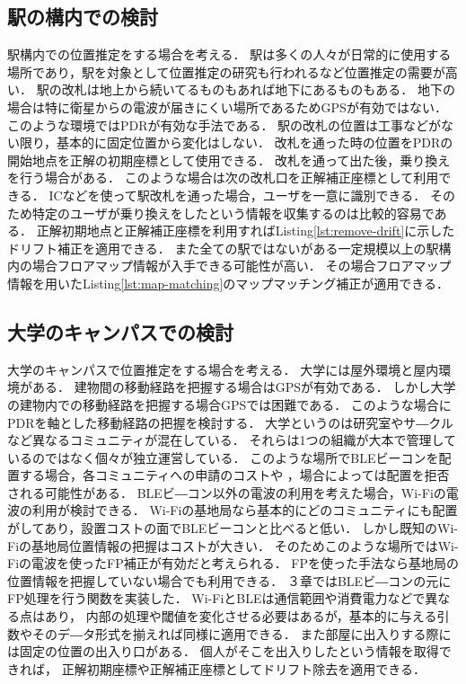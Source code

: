\subsection{駅の構内での検討}
駅構内での位置推定をする場合を考える．
駅は多くの人々が日常的に使用する場所であり，駅を対象として位置推定の研究も行われるなど位置推定の需要が高い．
駅の改札は地上から続いてるものもあれば地下にあるものもある．
地下の場合は特に衛星からの電波が届きにくい場所であるためGPSが有効ではない．
このような環境ではPDRが有効な手法である．
駅の改札の位置は工事などがない限り，基本的に固定位置から変化はしない．
改札を通った時の位置をPDRの開始地点を正解の初期座標として使用できる．
改札を通って出た後，乗り換えを行う場合がある．
このような場合は次の改札口を正解補正座標として利用できる．
ICなどを使って駅改札を通った場合，ユーザを一意に識別できる．
そのため特定のユーザが乗り換えをしたという情報を収集するのは比較的容易である．
正解初期地点と正解補正座標を利用すればListing\ref{lst:remove-drift}に示したドリフト補正を適用できる．
また全ての駅ではないがある一定規模以上の駅構内の場合フロアマップ情報が入手できる可能性が高い．
その場合フロアマップ情報を用いたListing\ref{lst:map-matching}のマップマッチング補正が適用できる．

\subsection{大学のキャンパスでの検討}
大学のキャンパスで位置推定をする場合を考える．
大学には屋外環境と屋内環境がある．
建物間の移動経路を把握する場合はGPSが有効である．
しかし大学の建物内での移動経路を把握する場合GPSでは困難である．
このような場合にPDRを軸とした移動経路の把握を検討する．
大学というのは研究室やサ―クルなど異なるコミュニティが混在している．
それらは1つの組織が大本で管理しているのではなく個々が独立運営している．
このような場所でBLEビーコンを配置する場合，各コミュニティへの申請のコストや
，場合によっては配置を拒否される可能性がある．
BLEビ―コン以外の電波の利用を考えた場合，Wi-Fiの電波の利用が検討できる．
Wi-Fiの基地局なら基本的にどのコミュニティにも配置がしてあり，設置コストの面でBLEビーコンと比べると低い．
しかし既知のWi-Fiの基地局位置情報の把握はコストが大きい．
そのためこのような場所ではWi-Fiの電波を使ったFP補正が有効だと考えられる．
FPを使った手法なら基地局の位置情報を把握していない場合でも利用できる．
３章ではBLEビ―コンの元にFP処理を行う関数を実装した．
Wi-FiとBLEは通信範囲や消費電力などで異なる点はあり，
内部の処理や閾値を変化させる必要はあるが，基本的に与える引数やそのデ―タ形式を揃えれば同様に適用できる．
また部屋に出入りする際には固定の位置の出入り口がある．
個人がそこを出入りしたという情報を取得できれば，
正解初期座標や正解補正座標としてドリフト除去を適用できる．


